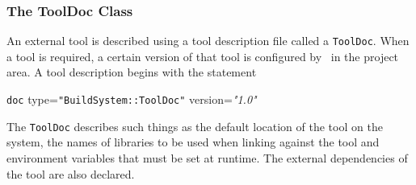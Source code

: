 \subsubsection{The ToolDoc Class}\label{sec:tooldocclass}
An external tool is described using a tool description file called a
\texttt{ToolDoc}. When a tool is required, a certain version of that
tool is configured by \scram\ in the project area.  A tool description
begins with the statement
\begin{tagprint}
  \lbkt\texttt{doc} type=\texttt{"BuildSystem::ToolDoc"} version=\textit{"1.0"}\rbkt
\end{tagprint}
\ni The \texttt{ToolDoc} describes such things as the default location
of the tool on the system, the names of libraries to be used when
linking against the tool and environment variables that must be set at
runtime. The external dependencies of the tool are also declared.

